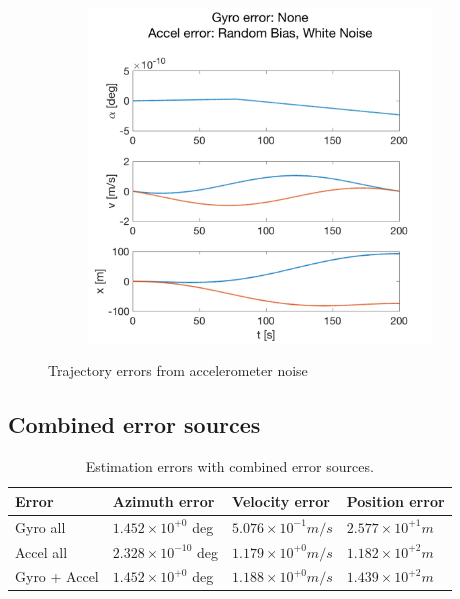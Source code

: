 \documentclass{article}
\newcommand{\e}[1]{\times 10^{#1}} %
\begin{document}
\begin{figure}[H]
\begin{subfigure}[t]{0.49\textwidth}
        \caption{}
    \end{subfigure}
    ~
    \begin{subfigure}[t]{0.49\textwidth}
        \centering
        \includegraphics[width=\textwidth]{fig/accel_all}
        \caption{}
    \end{subfigure}
    \caption{Trajectory errors from accelerometer noise}
    \label{fig:error_accel}
\end{figure}

\subsection*{Combined error sources}

\begin{table}[h]
\centering
\begin{tabular}{llll}
Error  & Azimuth error & Velocity error & Position error \\
\hline
Gyro all & $1.452\e{+0}$ deg & $5.076\e{-1} \si{m/s}$ & $2.577\e{+1} \si{m}$ \\
Accel all & $2.328\e{-10}$ deg & $1.179\e{+0} \si{m/s}$ & $1.182\e{+2} \si{m}$ \\
Gyro + Accel & $1.452\e{+0}$ deg & $1.188\e{+0} \si{m/s}$ & $1.439\e{+2} \si{m}$
\end{tabular}
\caption{Estimation errors with combined error sources.}
\label{tab:combined_err}
\end{table}
\end{document}
